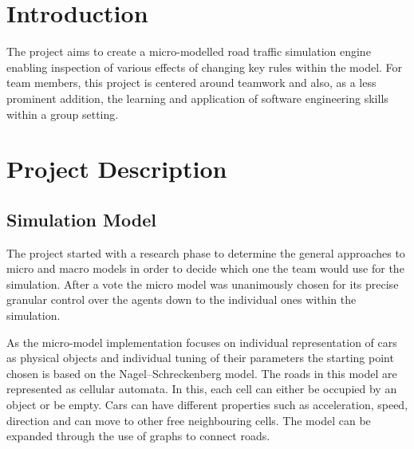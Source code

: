 
\section{Introduction}

The project aims to create a micro-modelled road traffic simulation engine enabling inspection of various effects of changing key rules within the model. For team members, this project is centered around teamwork and also, as a less prominent addition, the learning and application of software engineering skills within a group setting.

\section{Project Description} %

\subsection{Simulation Model}
The project started with a research phase to determine the general approaches to micro and macro models in order to decide which one the team would use for the simulation. After a vote the micro model was unanimously chosen for its precise granular control over the agents down to the individual ones within the simulation.

\vspace{2mm}

As the micro-model implementation focuses on individual representation of cars as physical objects and individual tuning of their parameters the starting point chosen is based on the Nagel–Schreckenberg model. The roads in this model are represented as cellular automata\cite{Schreckenberg}. In this, each cell can either be occupied by an object or be empty. Cars can have different properties such as acceleration, speed, direction and can move to other free neighbouring cells. The model can be expanded through the use of graphs to connect roads.

